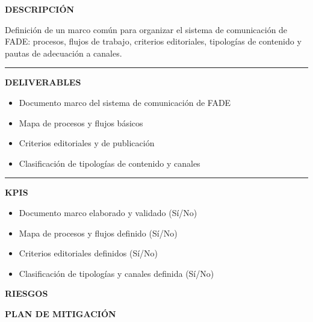 \documentclass[11pt,a4paper]{scrreprt}
\newcommand{\fieldlabel}[1]{%
  {\footnotesize\sffamily\bfseries\color{mutedcolor}\MakeUppercase{#1}}\par\nopagebreak[4]
}
\newcommand{\fieldsep}{\vspace{3pt}\noindent\textcolor{bordercolor}{\rule{\linewidth}{0.4pt}}\vspace{3pt}\par}
\begin{document}
\begin{tcolorbox}[pabox={comcolor}{PA1.1 \enspace\textbullet\enspace Definición del modelo de procesos, flujos y criterios del sistema de comunicación}]

\fieldlabel{Descripci\'on}
{\small Definición de un marco común para organizar el sistema de comunicación de FADE: procesos, flujos de trabajo, criterios editoriales, tipologías de contenido y pautas de adecuación a canales.}\par
\fieldsep
\fieldlabel{Deliverables}
{\small \begin{itemize}[noitemsep,topsep=2pt]
\item Documento marco del sistema de comunicación de FADE
\item Mapa de procesos y flujos básicos
\item Criterios editoriales y de publicación
\item Clasificación de tipologías de contenido y canales
\end{itemize}}\par
\fieldsep
\fieldlabel{KPIs}
{\small \begin{itemize}[noitemsep,topsep=2pt]
\item Documento marco elaborado y validado (Sí/No)
\item Mapa de procesos y flujos definido (Sí/No)
\item Criterios editoriales definidos (Sí/No)
\item Clasificación de tipologías y canales definida (Sí/No)
\end{itemize}}\par
\end{tcolorbox}
\begin{tcolorbox}[riskbox]
{\footnotesize\sffamily\bfseries\color{red!50!black} RIESGOS}\par{}
\end{tcolorbox}
\begin{tcolorbox}[mitbox]
{\footnotesize\sffamily\bfseries\color{green!40!black} PLAN DE MITIGACI\'ON}\par{}
\end{tcolorbox}
\vspace{8pt}
\end{document}
